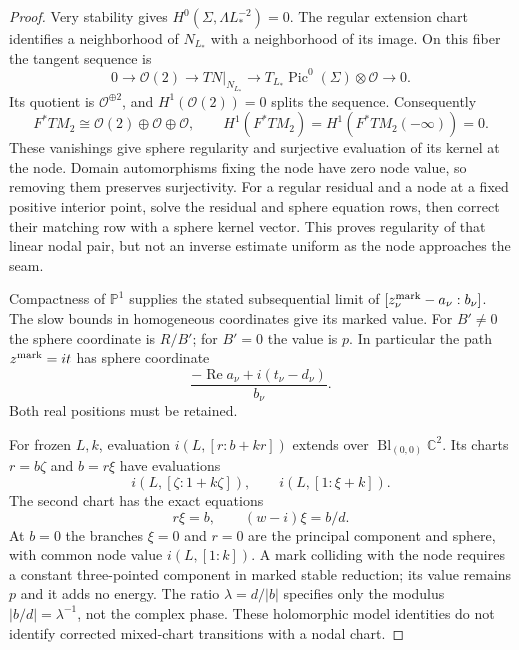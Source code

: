 \documentclass[11pt]{amsart}
\theoremstyle{definition}
\theoremstyle{remark}
\theoremstyle{plain}
\newcommand{\CC}{\mathbb{C}}
\newcommand{\PP}{\mathbb{P}}
\newcommand{\cO}{\mathcal{O}}
\begin{document}
\begin{proof}
Very stability gives $H^0(\Sigma,\Lambda L_*^{-2})=0$.
The regular extension chart identifies a neighborhood of
$N_{L_*}$ with a neighborhood of its image. On this fiber
the tangent sequence is
\[
 0\longrightarrow\cO(2)\longrightarrow TN|_{N_{L_*}}
       \longrightarrow T_{L_*}\operatorname{Pic}^0(\Sigma)
                              \otimes\cO\longrightarrow0.
\]
Its quotient is $\cO^{\oplus2}$, and $H^1(\cO(2))=0$
splits the sequence. Consequently
\begin{equation}\label{eq:regular-sphere-tangent-splitting}
 F^*TM_2\cong\cO(2)\oplus\cO\oplus\cO,\qquad
 H^1(F^*TM_2)=H^1(F^*TM_2(-\infty))=0.
\end{equation}
These vanishings give sphere regularity and surjective
evaluation of its kernel at the node. Domain automorphisms
fixing the node have zero node value, so removing them
preserves surjectivity. For a regular residual and a node
at a fixed positive interior point, solve the residual and
sphere equation rows, then correct their matching row with
a sphere kernel vector. This proves regularity of that
linear nodal pair, but not an inverse estimate uniform as
the node approaches the seam.

Compactness of $\PP^1$ supplies the stated subsequential
limit of $[z_\nu^{\rm mark}-a_\nu:b_\nu]$. The slow bounds
in homogeneous coordinates give its marked value.
For $B'\ne0$ the sphere coordinate is $R/B'$; for $B'=0$
the value is $p$. In particular the path $z^{\rm mark}=it$
has sphere coordinate
\begin{equation}\label{eq:positive-sphere-mark-ratio}
       \frac{-\operatorname{Re}a_\nu+i(t_\nu-d_\nu)}{b_\nu}.
\end{equation}
Both real positions must be retained.

For frozen $L,k$, evaluation $i(L,[r:b+kr])$ extends
over $\operatorname{Bl}_{(0,0)}\CC^2$. Its charts
$r=b\zeta$ and $b=r\xi$ have evaluations
\[
             i(L,[\zeta:1+k\zeta]),\qquad i(L,[1:\xi+k]).
\]
The second chart has the exact equations
\begin{equation}\label{eq:positive-sphere-node-coordinates}
                    r\xi=b,\qquad (w-i)\xi=b/d.
\end{equation}
At $b=0$ the branches $\xi=0$ and $r=0$ are the principal
component and sphere, with common node value $i(L,[1:k])$.
A mark colliding with the node requires a constant
three-pointed component in marked stable reduction;
its value remains $p$ and it adds no energy.
The ratio $\lambda=d/|b|$ specifies only the modulus
$|b/d|=\lambda^{-1}$, not the complex phase.
These holomorphic model identities do not identify
corrected mixed-chart transitions with a nodal chart.
\end{proof}
\end{document}

